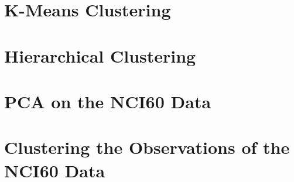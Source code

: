 \documentclass[
]{book}
\begin{document}
\hypertarget{k-means-clustering}{%
\section{K-Means Clustering}\label{k-means-clustering}}

\hypertarget{hierarchical-clustering}{%
\section{Hierarchical Clustering}\label{hierarchical-clustering}}

\hypertarget{pca-on-the-nci60-data}{%
\section{PCA on the NCI60 Data}\label{pca-on-the-nci60-data}}

\hypertarget{clustering-the-observations-of-the-nci60-data}{%
\section{Clustering the Observations of the NCI60 Data}\label{clustering-the-observations-of-the-nci60-data}}

  
\end{document}
